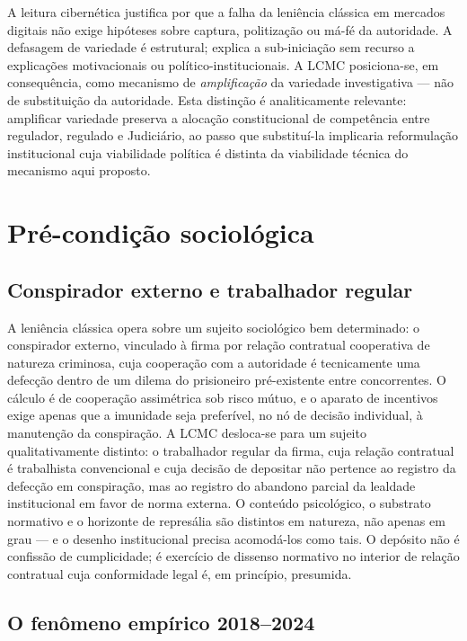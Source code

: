 \documentclass[12pt,a4paper]{article}
\begin{document}
A leitura cibernética justifica por que a falha da leniência clássica em
mercados digitais não exige hipóteses sobre captura, politização ou má-fé da
autoridade. A defasagem de variedade é estrutural; explica a sub-iniciação sem
recurso a explicações motivacionais ou político-institucionais. A LCMC
posiciona-se, em consequência, como mecanismo de \emph{amplificação} da
variedade investigativa --- não de substituição da autoridade. Esta distinção é
analiticamente relevante: amplificar variedade preserva a alocação
constitucional de competência entre regulador, regulado e Judiciário, ao passo
que substituí-la implicaria reformulação institucional cuja viabilidade
política é distinta da viabilidade técnica do mecanismo aqui proposto.

\section{Pré-condição sociológica}
\label{sec:sociologia}

\subsection{Conspirador externo e trabalhador regular}

A leniência clássica opera sobre um sujeito sociológico bem determinado: o
conspirador externo, vinculado à firma por relação contratual cooperativa de
natureza criminosa, cuja cooperação com a autoridade é tecnicamente uma defecção
dentro de um dilema do prisioneiro pré-existente entre concorrentes. O cálculo
é de cooperação assimétrica sob risco mútuo, e o aparato de incentivos exige
apenas que a imunidade seja preferível, no nó de decisão individual, à
manutenção da conspiração. A LCMC desloca-se para um sujeito qualitativamente
distinto: o trabalhador regular da firma, cuja relação contratual é trabalhista
convencional e cuja decisão de depositar não pertence ao registro da defecção
em conspiração, mas ao registro do abandono parcial da lealdade institucional
em favor de norma externa. O conteúdo psicológico, o substrato normativo e o
horizonte de represália são distintos em natureza, não apenas em grau --- e o
desenho institucional precisa acomodá-los como tais. O depósito não é confissão
de cumplicidade; é exercício de dissenso normativo no interior de relação
contratual cuja conformidade legal é, em princípio, presumida.

\subsection{O fenômeno empírico 2018--2024}
\end{document}

